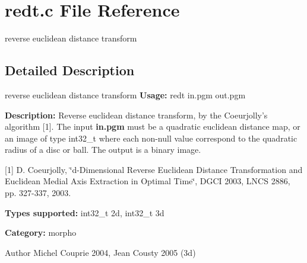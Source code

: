 \section{redt.c File Reference}
\label{redt_8c}


reverse euclidean distance transform  




\subsection{Detailed Description}
reverse euclidean distance transform {\bfseries Usage:} redt in.pgm out.pgm

{\bfseries Description:} Reverse euclidean distance transform, by the Coeurjolly's algorithm [1]. The input {\bfseries in.pgm} must be a quadratic euclidean distance map, or an image of type int32\_\-t where each non-\/null value correspond to the quadratic radius of a disc or ball. The output is a binary image.

[1] D. Coeurjolly, \char`\"{}d-\/Dimensional Reverse Euclidean Distance Transformation
and Euclidean Medial Axis Extraction in Optimal Time\char`\"{}, DGCI 2003, LNCS 2886, pp. 327-\/337, 2003.

{\bfseries Types supported:} int32\_\-t 2d, int32\_\-t 3d

{\bfseries Category:} morpho

\begin{DoxyAuthor}{Author}
Michel Couprie 2004, Jean Cousty 2005 (3d) 
\end{DoxyAuthor}
